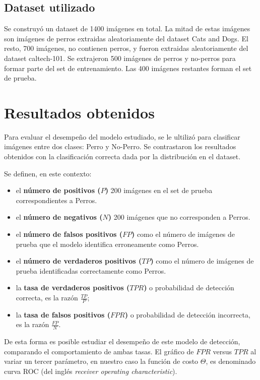 \documentclass[12pt]{article}
\begin{document}
\subsection{Dataset utilizado}

Se construyó un dataset de 1400 imágenes en total. La mitad de estas imágenes
son imágenes de perros extraidas aleatoriamente del dataset Cats and Dogs\cite{parkhi12a}.  El
resto, 700 imágenes, no contienen perros, y fueron extraidas aleatoriamente del
dataset caltech-101\cite{caltech101}.  Se extrajeron 500 imágenes de perros y no-perros para
formar parte del set de entrenamiento.  Las 400 imágenes restantes forman el set
de prueba.

\section{Resultados obtenidos}

Para evaluar el desempeño del modelo estudiado, se le ultilizó para clasificar
imágenes entre dos clases: Perro y No-Perro. Se contrastaron los resultados
obtenidos con la clasificación correcta dada por la distribución en el dataset.

Se definen, en este contexto: 

\begin{itemize}
    \item el \textbf{número de positivos ($P$)} 200 imágenes en el set de prueba correspondientes a Perros.
    \item el \textbf{número de negativos ($N$)} 200 imágenes que no corresponden a Perros.
    \item el \textbf{número de falsos positivos ($FP$)} como el número de
        imágenes de prueba que el modelo identifica erroneamente como Perros.
    \item el \textbf{número de verdaderos positivos ($TP$)} como el número de
        imágenes de prueba identificadas correctamente como Perros.
    \item la \textbf{tasa de verdaderos positivos ($TPR$)} o probabilidad de detección correcta, es la razón $\frac{TP}{P}$;
    \item la \textbf{tasa de falsos positivos ($FPR$)} o probabilidad de detección incorrecta, es la razón $\frac{FP}{N}$.
\end{itemize}

De esta forma es posible estudiar el desempeño de este modelo de detección, comparando el comportamiento de ambas tasas.
El gráfico de $FPR$ versus $TPR$ al variar un tercer parámetro, en nuestro caso la función de costo $\Theta$, es denominado curva
ROC (del inglés \emph{receiver operating characteristic}).
\end{document}
